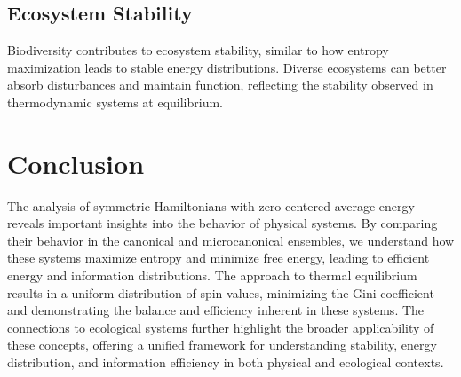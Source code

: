 \documentclass{article}
\begin{document}
\subsection{Ecosystem Stability}
Biodiversity contributes to ecosystem stability, similar to how entropy maximization leads to stable energy distributions. Diverse ecosystems can better absorb disturbances and maintain function, reflecting the stability observed in thermodynamic systems at equilibrium.

\section{Conclusion}

The analysis of symmetric Hamiltonians with zero-centered average energy reveals important insights into the behavior of physical systems. By comparing their behavior in the canonical and microcanonical ensembles, we understand how these systems maximize entropy and minimize free energy, leading to efficient energy and information distributions. The approach to thermal equilibrium results in a uniform distribution of spin values, minimizing the Gini coefficient and demonstrating the balance and efficiency inherent in these systems. The connections to ecological systems further highlight the broader applicability of these concepts, offering a unified framework for understanding stability, energy distribution, and information efficiency in both physical and ecological contexts.



\nocite{*}
\end{document}
